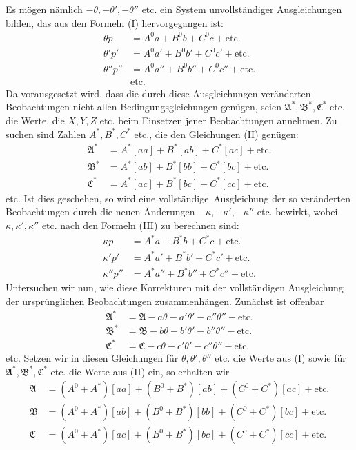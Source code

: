 Es mögen nämlich \(-\theta,-\theta',-\theta''\) etc. ein System unvollständiger Ausgleichungen bilden, das aus den Formeln (I) hervorgegangen ist:
\[
\begin{aligned}
\theta p&=A^0a+B^0b+C^0c+\text{etc.}\\
\theta'p'&=A^0a'+B^0b'+C^0c'+\text{etc.}\\
\theta''p''&=A^0a''+B^0b''+C^0c''+\text{etc.}\\
&\text{etc.}
\end{aligned}
\]
Da vorausgesetzt wird, dass die durch diese Ausgleichungen veränderten Beobachtungen nicht allen Bedingungsgleichungen genügen, seien \(\mathfrak A^*,\mathfrak B^*,\mathfrak C^*\) etc. die Werte, die \(X,Y,Z\) etc. beim Einsetzen jener Beobachtungen annehmen. Zu suchen sind Zahlen \(A^*,B^*,C^*\) etc., die den Gleichungen (II) genügen:
\[
\begin{aligned}
\mathfrak A^*&=A^*[aa]+B^*[ab]+C^*[ac]+\text{etc.}\\
\mathfrak B^*&=A^*[ab]+B^*[bb]+C^*[bc]+\text{etc.}\\
\mathfrak C^*&=A^*[ac]+B^*[bc]+C^*[cc]+\text{etc.}
\end{aligned}
\]
etc. Ist dies geschehen, so wird eine vollständige\textperiodcentered\ Ausgleichung der so veränderten Beobachtungen durch die neuen Änderungen \(-\kappa,-\kappa',-\kappa''\) etc. bewirkt, wobei \(\kappa,\kappa',\kappa''\) etc. nach den Formeln (III) zu berechnen sind:
\[
\begin{aligned}
\kappa p&=A^*a+B^*b+C^*c+\text{etc.}\\
\kappa'p'&=A^*a'+B^*b'+C^*c'+\text{etc.}\\
\kappa''p''&=A^*a''+B^*b''+C^*c''+\text{etc.}
\end{aligned}
\]
Untersuchen wir nun, wie diese Korrekturen mit der vollständigen Ausgleichung der ursprünglichen
Beobachtungen zusammenhängen. Zunächst ist offenbar
\[
\begin{aligned}
\mathfrak A^*&=\mathfrak A-a\theta-a'\theta'-a''\theta''-\text{etc.}\\
\mathfrak B^*&=\mathfrak B-b\theta-b'\theta'-b''\theta''-\text{etc.}\\
\mathfrak C^*&=\mathfrak C-c\theta-c'\theta'-c''\theta''-\text{etc.}
\end{aligned}
\]
etc. Setzen wir in diesen Gleichungen für \(\theta,\theta',\theta''\) etc. die Werte aus (I) sowie für \(\mathfrak A^*,\mathfrak B^*,\mathfrak C^*\) etc. die Werte aus (II) ein, so erhalten wir
\[
\begin{aligned}
\mathfrak A&=(A^0+A^*)[aa]+(B^0+B^*)[ab]+(C^0+C^*)[ac]+\text{etc.}\\
\mathfrak B&=(A^0+A^*)[ab]+(B^0+B^*)[bb]+(C^0+C^*)[bc]+\text{etc.}\\
\mathfrak C&=(A^0+A^*)[ac]+(B^0+B^*)[bc]+(C^0+C^*)[cc]+\text{etc.}
\end{aligned}
\]
